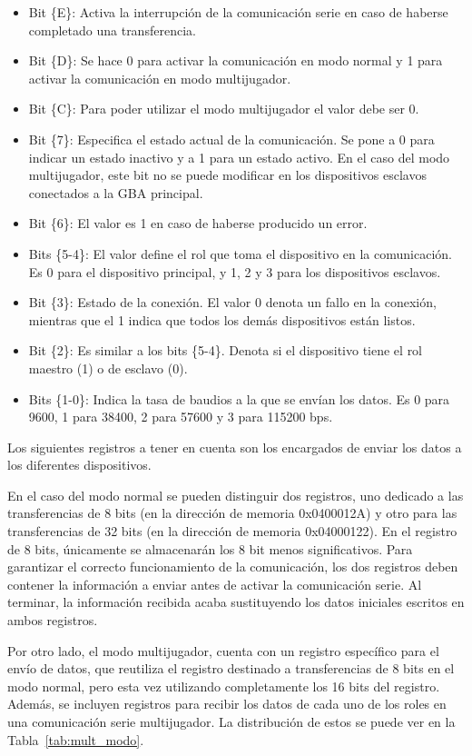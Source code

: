 {\begin{itemize}
	\item Bit \{E\}: Activa la interrupción de la comunicación serie en caso de haberse completado una transferencia.
	\item Bit \{D\}: Se hace 0 para activar la comunicación en modo normal y 1 para activar la comunicación en modo multijugador.
	\item Bit \{C\}: Para poder utilizar el modo multijugador el valor debe ser 0.
	\item Bit \{7\}: Especifica el estado actual de la comunicación. Se pone a 0 para indicar un estado inactivo y a 1 para un estado activo. En el caso del modo multijugador, este bit no se puede modificar en los dispositivos esclavos conectados a la GBA principal.
	\item Bit \{6\}: El valor es 1 en caso de haberse producido un error.
	\item Bits \{5-4\}: El valor define el rol que toma el dispositivo en la comunicación. Es 0 para el dispositivo principal, y 1, 2 y 3 para los dispositivos esclavos.
	\item Bit \{3\}: Estado de la conexión. El valor 0 denota un fallo en la conexión, mientras que el 1 indica que todos los demás dispositivos están listos. 
	\item Bit \{2\}: Es similar a los bits \{5-4\}. Denota si el dispositivo tiene el rol maestro (1) o de esclavo (0).
	\item Bits \{1-0\}: Indica la tasa de baudios a la que se envían los datos. Es 0 para 9600, 1 para 38400, 2 para 57600 y 3 para 115200 bps.
\end{itemize}

Los siguientes registros a tener en cuenta son los encargados de enviar los datos a los diferentes dispositivos.  

En el caso del modo normal se pueden distinguir dos registros, uno dedicado a las transferencias de 8 bits (en la dirección de memoria 0x0400012A) y otro para las transferencias de 32 bits (en la dirección de memoria 0x04000122). En el registro de 8 bits, únicamente se almacenarán los 8 bit menos significativos. Para garantizar el correcto funcionamiento de la comunicación, los dos registros deben contener la información a enviar antes de activar la comunicación serie. Al terminar, la información recibida acaba sustituyendo los datos iniciales escritos en ambos registros.

Por otro lado, el modo multijugador, cuenta con un registro específico para el envío de datos, que reutiliza el registro destinado a transferencias de 8 bits en el modo normal, pero esta vez utilizando completamente los 16 bits del registro. Además, se incluyen registros para recibir los datos de cada uno de los roles en una comunicación serie multijugador. La distribución de estos se puede ver en la Tabla~\ref{tab:mult_modo}.

}
